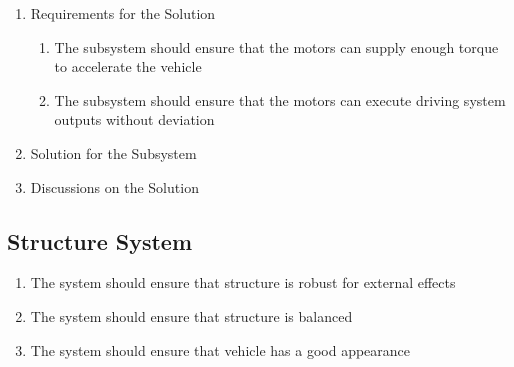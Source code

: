 \documentclass[a4paper,12pt]{article}
\begin{document}
		\begin{enumerate}
			\item {Requirements for the Solution}
			
			\begin{enumerate}
				\item The subsystem should ensure that the motors can supply enough torque to accelerate the vehicle 
				\item The subsystem should ensure that the motors can execute driving system outputs without deviation
			\end{enumerate} 

		\item {Solution for the Subsystem}

	
		\item {Discussions on the Solution}


	\end{enumerate}	





\subsection{Structure System}



	\begin{enumerate}
		\item The system should	ensure that structure is robust for external effects 
		\item The system should	ensure that structure is balanced
		\item The system should ensure that vehicle has a good appearance
	\end{enumerate}	
\end{document}
